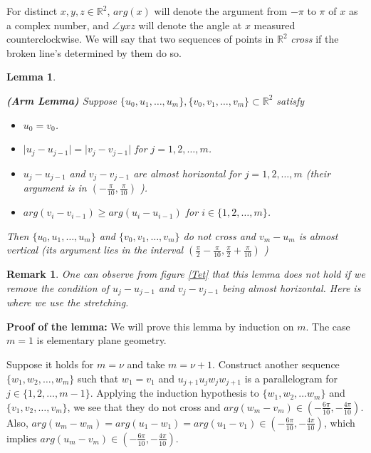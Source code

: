 \documentclass[openright, 12pt]{article}
\newtheorem{lema}[teorema]{Lemma}
\newtheorem{rem}[teorema]{Remark}
\newcommand{\field}[1]{\ensuremath{\mathbb{#1}}}
\newcommand{\R}{\field{R}}
\begin{document}
For distinct $x,y,z \in \R^2$, $arg (x)$ will denote the argument from $-\pi$ to $\pi$ of $x$ as a complex number, and $\angle yxz $ will denote the angle at $x$ measured counterclockwise. We will say that two sequences of points in $\R ^2$ \textit{cross} if the broken line's determined by them do so. 


\begin{lema} \label{Arm}
{\rm \textbf{(Arm Lemma)} Suppose $\{ u_0, u_1, \ldots , u_m     \}, \{ v_0, v_1, \ldots , v_m      \} \subset \R^2$ satisfy
\begin{itemize}
\item $u_0 = v_0$.
\item $\vert u_j - u_{j-1} \vert = \vert v_j - v_{j-1}  \vert$ for $j=1,2, \ldots, m$.
\item $u_{j }- u_{j-1} $ and $v_j - v_{j-1} $ are almost horizontal for $j = 1, 2, \ldots , m$ (their argument is in $\left( -\frac{\pi}{10},\frac{\pi}{10} \right)$ ).
\item $arg (v_{i} - v_{i-1} )\geq arg (u_{i} - u_{i-1})$ for $i \in \{ 1, 2, \ldots, m \} $.
\end{itemize}

Then $\{ u_0, u_1, \ldots , u_m     \}$ and $ \{ v_0, v_1, \ldots , v_m      \}$ do not cross and $v_m - u_m$ is almost vertical (its argument lies in the interval $\left(  \frac{\pi}{2} - \frac{\pi}{10} , \frac{\pi}{2} + \frac{\pi}{10}  \right)$ ) 
}
\end{lema}



\begin{rem}
{\rm One can observe from figure \ref{Tet} that this lemma does not hold if  we remove the condition of $u_{j }- u_{j-1}$ and $ v_j - v_{j-1} $ being almost horizontal. Here is where we use the stretching. 
}
\end{rem}




\textbf{Proof of the lemma: }We will prove this lemma by induction on $m$. The case $m=1$ is elementary plane geometry.


Suppose it holds for $m=\nu$ and take $m = \nu +1$. Construct another sequence $\{ w_1, w_2, \ldots, w_m   \}$ such that $w_1 = v_1$ and $u_{j+1}u_jw_jw_{j+1} $ is a parallelogram for $j \in \{ 1, 2, \ldots , m-1\} $. Applying the induction hypothesis to $\{ w_1, w_2, \ldots w_m   \}$ and $\{v_1, v_2, \ldots, v_m  \}$, we see that they do not cross and $arg( w_{m} - v_m) \in \left( - \frac{6 \pi}{10} , -\frac{4\pi}{10}  \right)$. Also, $arg(u_m - w_m )= arg (u_1 - w_1) = arg (u_1 - v_1) \in \left( - \frac{6 \pi}{10} , -\frac{4\pi}{10}  \right)$, which implies $arg(u_m - v_m)\in \left( - \frac{6 \pi}{10} , -\frac{4\pi}{10}  \right)$.
\end{document}
